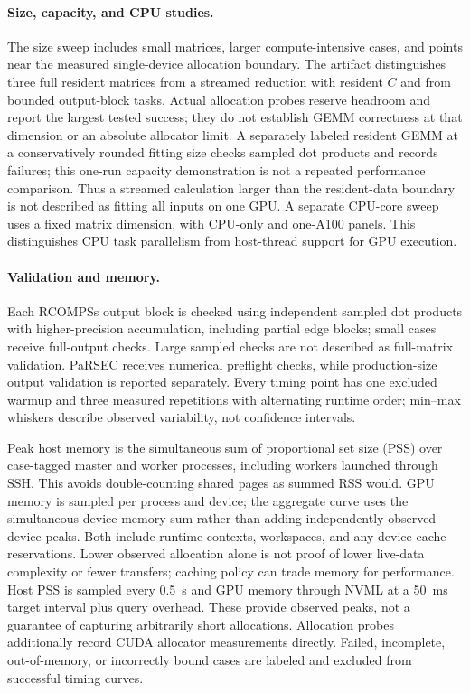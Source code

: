 \paragraph{Size, capacity, and CPU studies.}
The size sweep includes small matrices, larger compute-intensive cases, and points near the measured single-device allocation boundary. The artifact distinguishes three full resident matrices from a streamed reduction with resident $C$ and from bounded output-block tasks. Actual allocation probes reserve headroom and report the largest tested success; they do not establish GEMM correctness at that dimension or an absolute allocator limit. A separately labeled resident GEMM at a conservatively rounded fitting size checks sampled dot products and records failures; this one-run capacity demonstration is not a repeated performance comparison. Thus a streamed calculation larger than the resident-data boundary is not described as fitting all inputs on one GPU. A separate CPU-core sweep uses a fixed matrix dimension, with CPU-only and one-A100 panels. This distinguishes CPU task parallelism from host-thread support for GPU execution.

\paragraph{Validation and memory.}
Each RCOMPSs output block is checked using independent sampled dot products with higher-precision accumulation, including partial edge blocks; small cases receive full-output checks. Large sampled checks are not described as full-matrix validation. PaRSEC receives numerical preflight checks, while production-size output validation is reported separately. Every timing point has one excluded warmup and three measured repetitions with alternating runtime order; min--max whiskers describe observed variability, not confidence intervals.

Peak host memory is the simultaneous sum of proportional set size (PSS) over case-tagged master and worker processes, including workers launched through SSH. This avoids double-counting shared pages as summed RSS would. GPU memory is sampled per process and device; the aggregate curve uses the simultaneous device-memory sum rather than adding independently observed device peaks. Both include runtime contexts, workspaces, and any device-cache reservations. Lower observed allocation alone is not proof of lower live-data complexity or fewer transfers; caching policy can trade memory for performance. Host PSS is sampled every 0.5~s and GPU memory through NVML at a 50~ms target interval plus query overhead. These provide observed peaks, not a guarantee of capturing arbitrarily short allocations. Allocation probes additionally record CUDA allocator measurements directly. Failed, incomplete, out-of-memory, or incorrectly bound cases are labeled and excluded from successful timing curves.

